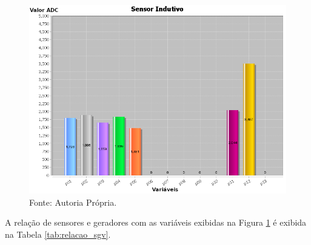 \begin{figure}[H]
	\vspace{4mm}
	\centering
	\caption{Valor dos sensores indutivos ao fazer o gesto da letra A em LIBRAS no software STM32Studio}
	\label{fig:sensores_letra_a}
	\includegraphics[scale=0.7]{imagens/LETRA_A_STMSTUDIO}
	\caption*{Fonte: Autoria Própria.}
\end{figure}

A relação de sensores e geradores com as variáveis exibidas na Figura \ref{fig:sensores_letra_a} é exibida na Tabela \ref{tab:relacao_sgv}.

\begin{table}[H]
	\vspace{4mm}
	\centering
	\caption{Relação de sensores e geradores com as variáveis da Figura \ref{fig:sensores_letra_a}}
	\label{tab:relacao_sgv}
	\vspace{4mm}
	\caption*{Fonte: Autoria Própria.}
\end{table}

